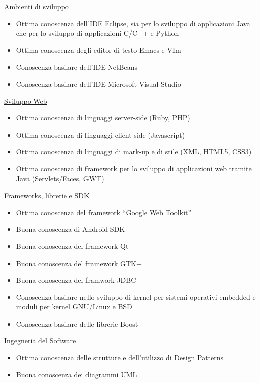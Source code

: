 \documentclass[margin]{res}
\begin{document}
\begin{resume}
	\underline{Ambienti di sviluppo}
		\begin{itemize}
			\item Ottima conoscenza dell'IDE Eclipse, sia per lo sviluppo di applicazioni Java
			che per lo sviluppo di applicazioni C/C++ e Python
			\item Ottima conoscenza degli editor di testo Emacs e VIm
			\item Conoscenza basilare dell'IDE NetBeans
			\item Conoscenza basilare dell'IDE Microsoft Visual Studio
		\end{itemize}

	\underline{Sviluppo Web}
		\begin{itemize}
			\item Ottima conoscenza di linguaggi server-side (Ruby, PHP)
			\item Ottima conoscenza di linguaggi client-side (Javascript)
			\item Ottima conoscenza di linguaggi di mark-up e di stile (XML, HTML5, CSS3)
			\item Ottima conoscenza di framework per lo sviluppo di applicazioni web tramite
			Java (Servlets/Faces, GWT)
		\end{itemize}

	\underline{Frameworks, librerie e SDK}
		\begin{itemize}
			\item Ottima conoscenza del framework ``Google Web Toolkit''
			\item Buona conoscenza di Android SDK
			\item Buona conoscenza del framework Qt
			\item Buona conoscenza del framework GTK+
			\item Buona conoscenza del framwork JDBC
			\item Conoscenza basilare nello sviluppo di kernel per sistemi operativi
			embedded e moduli per kernel GNU/Linux e BSD
			\item Conoscenza basilare delle librerie Boost
		\end{itemize}

	\underline{Ingegneria del Software}
		\begin{itemize}
			\item Ottima conoscenza delle strutture e dell'utilizzo di Design Patterns 
			\item Buona conoscenza dei diagrammi UML
		\end{itemize}


\end{resume}
\end{document}
